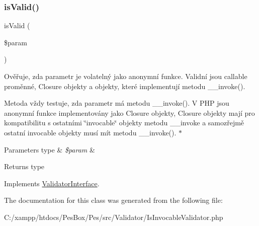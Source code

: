 \subsubsection{\texorpdfstring{is\+Valid()}{isValid()}}
{\footnotesize\ttfamily is\+Valid (\begin{DoxyParamCaption}\item[{}]{\$param }\end{DoxyParamCaption})}

Ověřuje, zda parametr je volatelný jako anonymní funkce. Validní jsou callable proměnné, Closure objekty a objekty, které implementují metodu \+\_\+\+\_\+invoke().

Metoda vždy testuje, zda parametr má metodu \+\_\+\+\_\+invoke(). V P\+HP jsou anonymní funkce implementovány jako Closure objekty, Closure objekty mají pro kompatibilitu s ostatními \char`\"{}invocable\char`\"{} objekty metodu \+\_\+\+\_\+invoke a samozřejmě ostatní invocable objekty musí mít metodu \+\_\+\+\_\+invoke(). $\ast$
\begin{DoxyParams}[1]{Parameters}
type & {\em \$param} & \\
\hline
\end{DoxyParams}
\begin{DoxyReturn}{Returns}
type 
\end{DoxyReturn}


Implements \mbox{\hyperlink{interface_pes_1_1_validator_1_1_validator_interface_a250dbda694ce9c4d0dd4e71e1df35882}{Validator\+Interface}}.



The documentation for this class was generated from the following file\+:\begin{DoxyCompactItemize}
\item 
C\+:/xampp/htdocs/\+Pes\+Box/\+Pes/src/\+Validator/Is\+Invocable\+Validator.\+php\end{DoxyCompactItemize}
